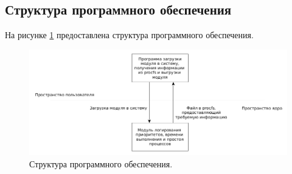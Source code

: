 \subsection{Структура программного обеспечения}
На рисунке \ref{fig:softwareStructure} предоставлена структура программного обеспечения.

\begin{figure}[H]
	\centering
	\includegraphics[scale=0.5]{img/softwareStructure.png}
	\caption{Структура программного обеспечения. }
	\label{fig:softwareStructure}
\end{figure}

\pagebreak